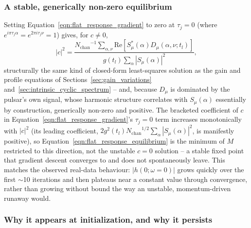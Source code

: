 \documentclass[manuscript]{aastex631}
\newcommand{\Nchan}{\ensuremath{N_\mathrm{chan}}}
\newcommand{\Eqn}[1]{Equation~\ref{eqn:#1}}
\begin{document}
\subsubsection*{A stable, generically non-zero equilibrium}

Setting \Eqn{flat_response_gradient} to zero at $\tau_j=0$ (where $e^{i\pi\tau_j\alpha}=e^{2\pi i
\tau_j\nu}=1$) gives, for $c\ne0$,
\begin{equation}
|c|^2 = \frac{\Nchan^{-1}\sum_{\alpha,\nu}\mathrm{Re}\left[S_\mu^*(\alpha)D_\mu(\alpha,\nu;t_l)\right]}
{g(t_l)\sum_\alpha|S_\mu(\alpha)|^2},
\label{eqn:flat_response_equilibrium}
\end{equation}
structurally the same kind of closed-form least-squares solution as the gain and profile equations
of Sections~\ref{sec:gain_variations} and~\ref{sec:intrinsic_cyclic_spectrum} -- and, because
$D_\mu$ is dominated by the pulsar's own signal, whose harmonic structure correlates with
$S_\mu(\alpha)$ essentially by construction, generically non-zero and positive. The bracketed
coefficient of $c$ in \Eqn{flat_response_gradient}'s $\tau_j=0$ term increases monotonically with
$|c|^2$ (its leading coefficient, $2g^2(t_l)\Nchan^{1/2}\sum_\alpha|S_\mu(\alpha)|^2$, is manifestly
positive), so \Eqn{flat_response_equilibrium} is the minimum of $M$ restricted to this direction,
not the unstable $c=0$ solution -- a stable fixed point that gradient descent converges to and does
not spontaneously leave. This matches the observed real-data behaviour: $|h(0;\omega{=}0)|$ grows
quickly over the first $\sim$10 iterations and then plateaus near a constant value through
convergence, rather than growing without bound the way an unstable, momentum-driven runaway would.

\subsubsection*{Why it appears at initialization, and why it persists}
\end{document}
